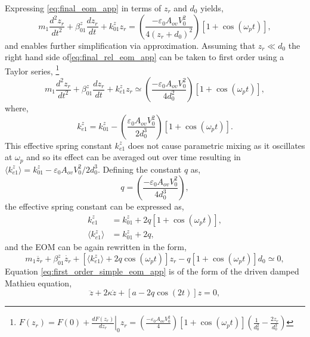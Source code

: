 \documentclass{article}
\begin{document}
Expressing \eqref{eq:final_eom_app} in terms of $z_r$ and $d_0$ yields,
\begin{equation}
	m_1 \frac{d^2z_r}{dt^2} + \beta_{01}^z \frac{dz_r}{dt} + k_{01}^zz_r = \left( \frac{-\varepsilon_0 A_{ov} V_0^2}{4(z_r+d_0)^2}\right)\left[1+\cos(\omega_pt)\right],
\label{eq:final_rel_eom_app}
\end{equation}
and enables further simplification via approximation. Assuming that $z_r \ll d_0$ the right hand side of\eqref{eq:final_rel_eom_app} can be taken to first order using a Taylor series,%
\footnote{$F(z_r) = F(0) + \left.\frac{dF(z_r)}{dz_r}\right\rvert_0 z_r = \left(\frac{-\varepsilon_0 A_{ov} V_0^2}{4}\right) [1+\cos(\omega_pt)] \left(\frac{1}{d_0^2} - \frac{2z_r}{d_0^3 }\right)$}
%
\begin{equation}
m_1 \frac{d^2z_r}{dt^2} + \beta_{01}^z \frac{dz_r}{dt} + k_{e1}^zz_r \simeq \left(\frac{-\varepsilon_0 A_{ov} V_0^2}{4d_0^2}\right) \left[1+\cos(\omega_pt)\right],
\label{eq:first_order_eom_app}
\end{equation}
%
where,
%
\begin{equation}
k_{e1}^z = k_{01}^z - \left(\frac{\varepsilon_0 A_{ov} V_0^2}{2d_0^3}\right) \left[1+\cos(\omega_pt)\right].
\end{equation}
This effective spring constant $k_{e1}^z$ does not cause parametric mixing as it oscillates at $\omega_p$ and so its effect can be averaged out over time resulting in $\langle k_{e1}^{z} \rangle = k_{01}^z - {\varepsilon_0 A_{ov} V_0^2}/{2d_0^3}$. Defining the constant $q$ as,
\begin{equation} q = \left(\frac{-\varepsilon_0 A_{ov} V_0^2}{4d_0^3}\right), \end{equation}
the effective spring constant can be expressed as,
\begin{align}
k_{e1}^z &= k_{01}^z + 2q \left[1+\cos(\omega_pt)\right],\\
\langle k_{e1}^{z} \rangle &= k_{01}^z + 2q,
\end{align}
and the EOM can be again rewritten in the form,
\begin{equation}
m_1\ddot{z_r} + \beta_{01}^z\dot{z_r} + \left[\langle k_{e1}^z\rangle + 2q\cos(\omega_pt)\right]z_r - q\left[1+\cos(\omega_pt)\right]d_0 \simeq 0,
\label{eq:first_order_simple_eom_app}
\end{equation}
Equation \eqref{eq:first_order_simple_eom_app} is of the form of the driven damped Mathieu equation,
\begin{equation} \ddot{z} + 2\kappa\dot{z} + [a - 2q\cos(2t)]z = 0, \end{equation}
\end{document}
